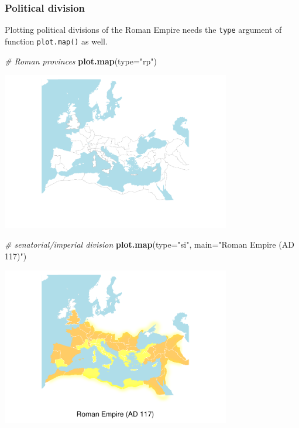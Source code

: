 \documentclass[a4paper,11pt]{memoir}
\newenvironment{Shaded}{\begin{snugshade}}{\end{snugshade}}
\newcommand{\CommentTok}[1]{\textcolor[rgb]{0.56,0.35,0.01}{\textit{#1}}}
\newcommand{\DataTypeTok}[1]{\textcolor[rgb]{0.13,0.29,0.53}{#1}}
\newcommand{\KeywordTok}[1]{\textcolor[rgb]{0.13,0.29,0.53}{\textbf{#1}}}
\newcommand{\NormalTok}[1]{#1}
\newcommand{\StringTok}[1]{\textcolor[rgb]{0.31,0.60,0.02}{#1}}
\begin{document}
\hypertarget{political-division}{%
\subsubsection{Political division}\label{political-division}}

Plotting political divisions of the Roman Empire needs the
\texttt{\textquotesingle{}type\textquotesingle{}} argument of function
\texttt{plot.map()} as well.

\begin{Shaded}
\begin{Highlighting}[]
\CommentTok{# Roman provinces}
\KeywordTok{plot.map}\NormalTok{(}\DataTypeTok{type=}\StringTok{"rp"}\NormalTok{)}
\end{Highlighting}
\end{Shaded}

{\centering
\includegraphics[width=10cm, trim=0 0 0 0, clip]{img/unnamed-chunk-3-1_} %
}

\begin{Shaded}
\begin{Highlighting}[]
\CommentTok{# senatorial/imperial division}
\KeywordTok{plot.map}\NormalTok{(}\DataTypeTok{type=}\StringTok{"si"}\NormalTok{, }\DataTypeTok{main=}\StringTok{"Roman Empire (AD 117)"}\NormalTok{)}
\end{Highlighting}
\end{Shaded}

{\centering
\includegraphics[width=10cm, trim=0 0 0 0, clip]{img/unnamed-chunk-4-1} %
}
\end{document}
